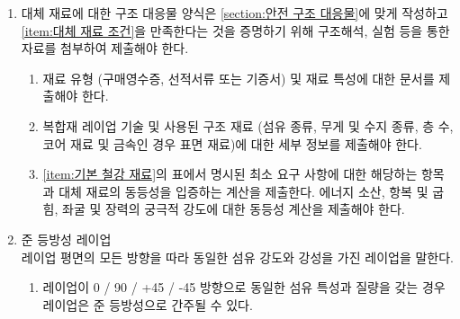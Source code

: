 \documentclass[final,a4paper,10pt]{report}
\begin{document}
\begin{enumerate}
  \item\label{rule:formula-technical.alternative-materials.sef-submission} 대체 재료에 대한 구조 대응물 양식은 \ref{section:안전 구조 대응물}에 맞게 작성하고 \ref{item:대체 재료 조건}을 만족한다는 것을 증명하기 위해 구조해석, 실험 등을 통한 자료를 첨부하여 제출해야 한다.
    \begin{enumerate}
      \item\label{rule:formula-technical.alternative-materials.sef-submission.material-type-and-properties} 재료 유형 (구매영수증, 선적서류 또는 기증서) 및 재료 특성에 대한 문서를 제출해야 한다.
      \item\label{rule:formula-technical.alternative-materials.sef-submission.layup-and-material-details} 복합재 레이업 기술 및 사용된 구조 재료 (섬유 종류, 무게 및 수지 종류, 층 수, 코어 재료 및 금속인 경우 표면 재료)에 대한 세부 정보를 제출해야 한다.
      \item\label{rule:formula-technical.alternative-materials.sef-submission.equivalency-calculations} \ref{item:기본 철강 재료}의 표에서 명시된 최소 요구 사항에 대한 해당하는 항목과 대체 재료의 동등성을 입증하는 계산을 제출한다. 에너지 소산, 항복 및 굽힘, 좌굴 및 장력의 궁극적 강도에 대한 동등성 계산을 제출해야 한다.
    \end{enumerate}

  \item\label{rule:formula-technical.alternative-materials.quasi-isotropic-layup} 준 등방성 레이업\\
    레이업 평면의 모든 방향을 따라 동일한 섬유 강도와 강성을 가진 레이업을 말한다.
    \begin{enumerate}
      \item\label{rule:formula-technical.alternative-materials.quasi-isotropic-layup.equal-properties-per-orientation} 레이업이 0 / 90 / +45 / -45 방향으로 동일한 섬유 특성과 질량을 갖는 경우 레이업은 준 등방성으로 간주될 수 있다.
    \end{enumerate}


\end{enumerate}
\end{document}
